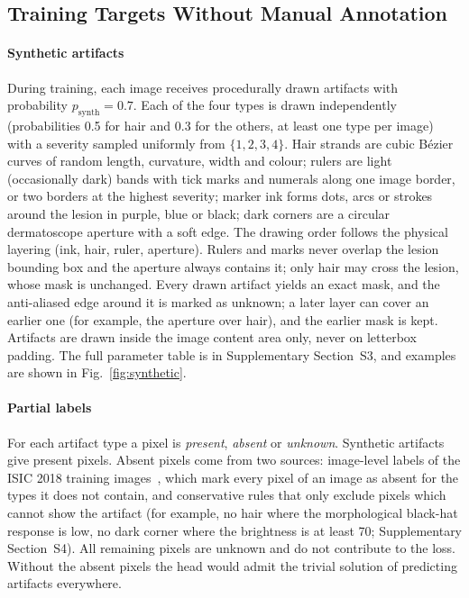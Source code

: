 \subsection{Training Targets Without Manual Annotation}\label{sec:targets}
\paragraph{Synthetic artifacts}
During training, each image receives procedurally drawn artifacts with probability $p_{\mathrm{synth}}=0.7$. Each of the four types is drawn independently (probabilities 0.5 for hair and 0.3 for the others, at least one type per image) with a severity sampled uniformly from $\{1,2,3,4\}$. Hair strands are cubic B\'ezier curves of random length, curvature, width and colour; rulers are light (occasionally dark) bands with tick marks and numerals along one image border, or two borders at the highest severity; marker ink forms dots, arcs or strokes around the lesion in purple, blue or black; dark corners are a circular dermatoscope aperture with a soft edge. The drawing order follows the physical layering (ink, hair, ruler, aperture). Rulers and marks never overlap the lesion bounding box and the aperture always contains it; only hair may cross the lesion, whose mask is unchanged. Every drawn artifact yields an exact mask, and the anti-aliased edge around it is marked as unknown; a later layer can cover an earlier one (for example, the aperture over hair), and the earlier mask is kept. Artifacts are drawn inside the image content area only, never on letterbox padding. The full parameter table is in Supplementary Section~S3, and examples are shown in Fig.~\ref{fig:synthetic}.

\paragraph{Partial labels}
For each artifact type a pixel is \emph{present}, \emph{absent} or \emph{unknown}. Synthetic artifacts give present pixels. Absent pixels come from two sources: image-level labels of the ISIC 2018 training images~\cite{bissoto2020debiasing,bissoto2022artifact}, which mark every pixel of an image as absent for the types it does not contain, and conservative rules that only exclude pixels which cannot show the artifact (for example, no hair where the morphological black-hat response is low, no dark corner where the brightness is at least 70; Supplementary Section~S4). All remaining pixels are unknown and do not contribute to the loss. Without the absent pixels the head would admit the trivial solution of predicting artifacts everywhere.

